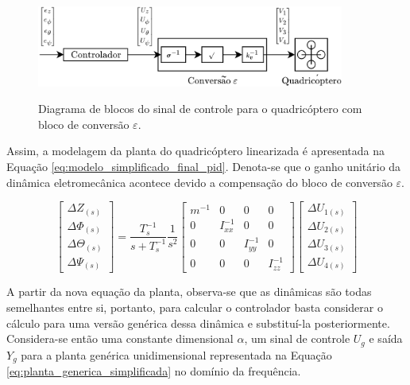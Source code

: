\documentclass[main.tex]{subfiles}
\begin{document}
\begin{figure}[!h]
	\centering
	\caption{Diagrama de blocos do sinal de controle para o quadricóptero com bloco de conversão $\varepsilon$.}
	\includegraphics[width=0.9\textwidth]{capitulos/controle_atitude/imgs/diagrama_sinal_quadricoptero.png}
	\label{fig:diagrama_sinal_quadricoptero}
\end{figure}

Assim, a modelagem da planta do quadricóptero linearizada é apresentada na Equação \ref{eq:modelo_simplificado_final_pid}. Denota-se que o ganho unitário da dinâmica eletromecânica acontece devido a compensação do bloco de conversão $\varepsilon$.

\begin{equation}\label{eq:modelo_simplificado_final_pid}
	\begin{bmatrix}
		\Delta Z_{(s)}\\
		\Delta \Phi_{(s)}\\
		\Delta \Theta_{(s)}\\
		\Delta \Psi_{(s)}
	\end{bmatrix} = \frac{T_s^{-1}}{s + T_s^{-1}}\frac{1}{s^2}\begin{bmatrix}
		m^{-1} & 0 & 0 & 0\\
		
		0 & I_{xx}^{-1} & 0 & 0\\
		
		0 & 0 & I_{yy}^{-1} & 0\\
		
		0 & 0 & 0 & I_{zz}^{-1}
	\end{bmatrix}\begin{bmatrix}
		\Delta U_{1(s)}\\
		\Delta U_{2(s)}\\
		\Delta U_{3(s)}\\
		\Delta U_{4(s)}
	\end{bmatrix}
\end{equation}

A partir da nova equação da planta, observa-se que as dinâmicas são todas semelhantes entre si, portanto, para calcular o controlador basta considerar o cálculo para uma versão genérica dessa dinâmica e substituí-la posteriormente. Considera-se então uma constante dimensional $\alpha$, um sinal de controle $U_g$ e saída $Y_g$ para a planta genérica unidimensional representada na Equação \ref{eq:planta_generica_simplificada} no domínio da frequência.
\end{document}
